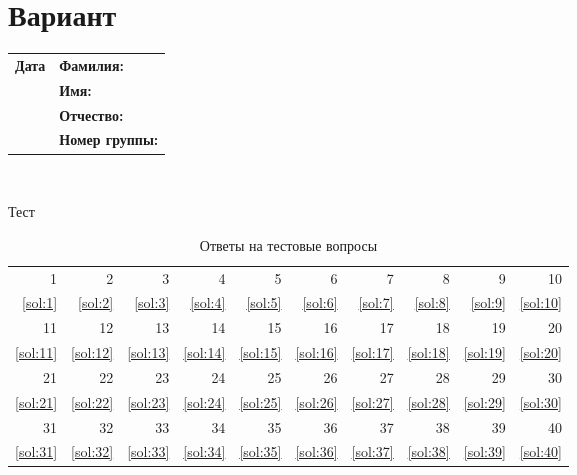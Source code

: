 \documentclass[12pt, table]{exam}
\begin{document}
\setcounter{section}{0\relax}%
\section{Вариант}

\noindent
	\begin{tabularx}{\textwidth}{XX}
	\textbf{\Large Дата \hrulefill} & \textbf{\Large Фамилия: \hrulefill } \\[1em]
	&\textbf{\Large Имя: \hrulefill}\\[1em]
	&\textbf{\Large Отчество:\hrulefill}\\[1em]
	&\textbf{\Large Номер группы:\hrulefill} \\[1em]
\end{tabularx}\\

\normalsize
\begin{questions}
\question[40] Тест
%
{
	{
		\begin{table}[htbp]
			\centering
			\Large
			\caption{Ответы на тестовые вопросы}
			\begin{tabular}{|r|r|r|r|r|r|r|r|r|r|}
				\hline
				1     & 2     & 3     & 4     & 5     & 6     & 7     & 8     & 9     & 10 \\
				\ref{sol:1}  & \ref{sol:2}  & \ref{sol:3}  & \ref{sol:4}  & \ref{sol:5}  & \ref{sol:6}  & \ref{sol:7}  & \ref{sol:8}  & \ref{sol:9}  & \ref{sol:10}  \\
				11    & 12    & 13    & 14    & 15    & 16    & 17    & 18    & 19    & 20 \\
				\ref{sol:11}  & \ref{sol:12}  & \ref{sol:13}  & \ref{sol:14}  & \ref{sol:15}  & \ref{sol:16}  & \ref{sol:17}  & \ref{sol:18}  & \ref{sol:19}  & \ref{sol:20}  \\
				21    & 22    & 23    & 24    & 25    & 26    & 27    & 28    & 29    & 30 \\
				\ref{sol:21}  & \ref{sol:22}  & \ref{sol:23}  & \ref{sol:24}  & \ref{sol:25}  & \ref{sol:26}  & \ref{sol:27}  & \ref{sol:28}  & \ref{sol:29}  & \ref{sol:30}  \\
				31    & 32    & 33    & 34    & 35    & 36    & 37    & 38    & 39    & 40 \\
				\ref{sol:31}  & \ref{sol:32}  & \ref{sol:33}  & \ref{sol:34}  & \ref{sol:35}  & \ref{sol:36}  & \ref{sol:37}  & \ref{sol:38}  & \ref{sol:39}  & \ref{sol:40}  \\
				\hline
			\end{tabular}%

\end{table}}}
\end{questions}
\end{document}
